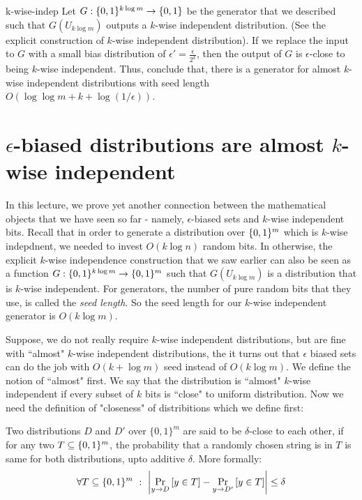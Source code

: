 \begin{exercise-prob}
\begin{show-ps4}{k-wise-indep}
Let $G : \{0,1\}^{k \log m} \to \{0,1\}$ be the generator that we described such that $G\left(U_{k \log m}\right)$ outputs a $k$-wise independent distribution. (See the explicit construction of $k$-wise independent distribution). If we replace the input to $G$ with a small bias distribution of $\epsilon' = \frac{\epsilon}{2^k}$, then the output of $G$ is $\epsilon$-close to being $k$-wise independent. Thus, conclude that, there is a generator for almost $k$-wise independent distributions with seed length $O\left(\log\log m+k+\log(1/\epsilon)\right)$.
\end{show-ps4}
\end{exercise-prob}

\section{$\epsilon$-biased distributions are almost $k$-wise independent}

In this lecture, we prove yet another connection between the mathematical objects that we have seen so far - namely, $\epsilon$-biased sets and $k$-wise independent bits. Recall that in order to generate a distribution over $\{0,1\}^m$ which is $k$-wise indepdnent, we needed to invest $O(k \log n)$ random bits. In otherwise, the explicit $k$-wise independence construction that we saw earlier can also be seen as a function $G : \{0,1\}^{k \log m} \to \{0,1\}^m$ such that $G\left(U_{k \log m}\right)$ is a distribution that is $k$-wise independent. For generators, the number of pure random bits that they use, is called the {\em seed length}. So the seed length for our $k$-wise independent generator is $O(k \log m)$.

Suppose, we do not really require $k$-wise independent distributions, but are fine with ``almost" $k$-wise independent distributions, the it turns out that $\epsilon$ biased sets can do the job with $O(k+\log m)$ seed instead of $O(k \log m)$. We define the notion of ``almost" first. We say that the distribution is ``almost" $k$-wise independent if every subset of $k$ bits is ``close" to uniform distribution. Now we need the definition of "closeness" of distribitions which we define first:

\begin{definition}
Two distributions $D$ and $D'$ over $\{0,1\}^m$ are said to be $\delta$-close to each other, if for any two $T \subseteq \{0,1\}^m$, the probability that a randomly chosen string is in $T$ is same for both distributions, upto additive $\delta$. More formally:
$$ \forall T \subseteq \{0,1\}^m~:~ \left| \Pr_{y \to D} \left[ y \in T \right] - \Pr_{y \to D'} \left[ y \in T \right] \right| \le \delta $$
\end{definition}

